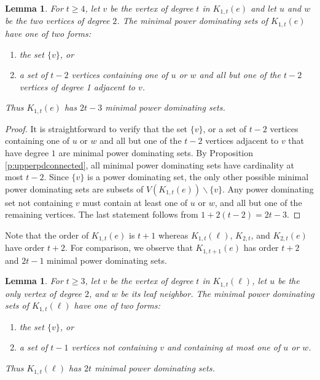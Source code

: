 \documentclass{article}
\numberwithin{figure}{section}   %
\newtheorem{lem}[thm]{Lemma}
\theoremstyle{definition}
\theoremstyle{definition}
\theoremstyle{definition}
\begin{document}
\begin{lem}\label{k1teminimalsets}
 For $t\ge 4$,  let $v$ be the vertex of degree $t$ in $K_{1,t}(e)$ and let $u$ and $w$  be the two vertices  of degree $2$.  The minimal power dominating sets of $K_{1,t}(e)$  have one of two forms: 
 \begin{enumerate}
\item the set $\{v\}$, or 
\item a set of $t-2$ vertices containing one of $u$ or $w$ and all but one of the $t-2$ vertices of degree 1 adjacent to $v$.  %
\end{enumerate}
Thus $K_{1,t}(e)$ has $2t-3$ minimal power dominating sets. 
\end{lem}

\begin{proof}
It is straightforward to verify that the set $\{v\}$, or  a set of $t-2$ vertices containing one of $u$ or $w$ and all but one of the $t-2$ vertices  adjacent to $v$ that have degree $1$ are minimal power dominating sets.  By Proposition \ref{p:upperpdconnected}, all minimal power dominating sets have cardinality at most $t-2$.   Since $\{v\}$ is a power dominating set, the only other possible minimal power dominating sets are subsets of $V(K_{1,t}(e)) \backslash \{v\}$.  Any power dominating set not containing $v$ must contain at least one of $u$ or $w$, and all but one of the remaining vertices. The last statement follows from $1+2(t-2)=2t-3$. 
\end{proof}

Note that the order of $K_{1,t}(e)$ is $t+1$ whereas  $K_{1,t}(\ell)$, $K_{2,t}$, and  $K_{2,t}(e)$ have order $t+2$.  For comparison, we observe that $K_{1,t+1}(e)$ has order $t+2$ and $2t-1$ minimal power dominating sets.

\begin{lem}\label{k1tellminimalsets}
For $t\ge 3$,  let $v$ be the vertex of degree  $t$ in $K_{1,t}(\ell)$, let $u$ be the only vertex of degree $2$, and $w$ be its leaf neighbor. The minimal power dominating sets of   $K_{1,t}(\ell)$ have one of two forms:
\begin{enumerate}
\item the set $\{v\}$, or 
\item a set of $t-1$ vertices not containing $v$ and  containing at most one of $u$ or $w$.
\end{enumerate}
Thus $K_{1,t}(\ell)$ has $2t$ minimal power dominating sets.\end{lem}
\end{document}
